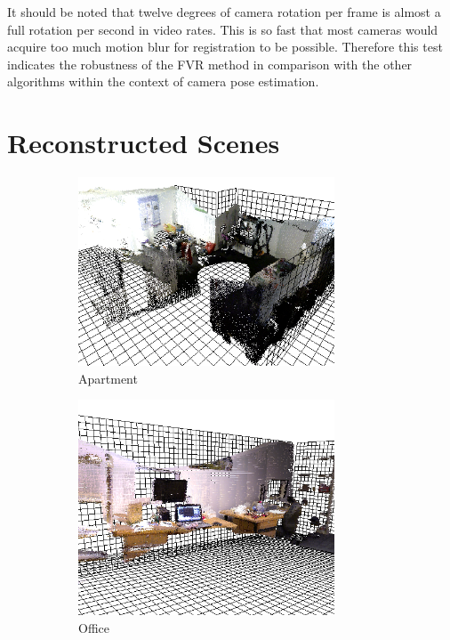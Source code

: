 It should be noted that twelve degrees of camera rotation per frame is almost a full rotation per second in video rates. This is so fast that most cameras would acquire too much motion blur for registration to be possible. Therefore this test indicates the robustness of the FVR method in comparison with the other algorithms within the context of camera pose estimation. \\


\section{Reconstructed Scenes}
\label{Sec:FVRQual1Exp}

\begin{figure}[!htb] 
        \centering
        \begin{subfigure}[b]{3.0in}
                \includegraphics[width=3.0in]{images/ch2/unit21}
                \caption{Apartment}
                \label{fig:RECON_UNIT}
        \end{subfigure}
        \begin{subfigure}[b]{3.0in}
                \includegraphics[width=3.0in]{images/ch2/officeA}
                \caption{Office}
                \label{fig:RECON_OFFICE}
        \end{subfigure}
        \begin{subfigure}[b]{3.0in}

\end{subfigure}
\end{figure}
